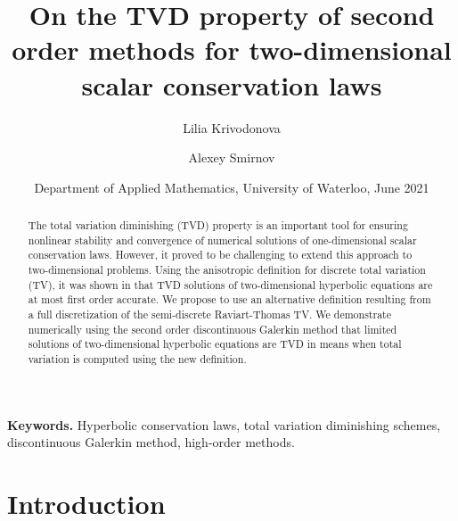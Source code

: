 \documentclass[reqno,a4paper,12pt]{amsart}
\title[On the TVD property of second order methods for 2D scalar conservation laws]{
On the TVD property of second order methods for two-dimensional scalar conservation laws}
\author{Lilia Krivodonova}
\author{Alexey Smirnov}
\date{Department of Applied Mathematics, University of Waterloo, June 2021}
\begin{document}
\maketitle

\newcommand\mycommfont[1]{\footnotesize\ttfamily\textcolor{blue}{#1}}
\begin{abstract}
The total variation diminishing (TVD) property is an important tool for ensuring nonlinear stability and convergence of numerical solutions of one-dimensional scalar conservation laws. However, it proved to be challenging to extend this approach to two-dimensional problems. Using the anisotropic definition for discrete total variation (TV), it was shown in \cite{Goodman} that TVD solutions of two-dimensional hyperbolic equations are at most first order accurate. 
We propose to use an alternative definition resulting from a full discretization of the semi-discrete Raviart-Thomas TV. We demonstrate numerically using the second order discontinuous Galerkin method that limited solutions of two-dimensional hyperbolic equations are TVD in means
when total variation is computed using the new definition.
\end{abstract}

\smallskip
\noindent \textbf{Keywords.} Hyperbolic conservation laws, total variation diminishing schemes, discontinuous Galerkin method, high-order methods. 

\section{Introduction}
\end{document}
